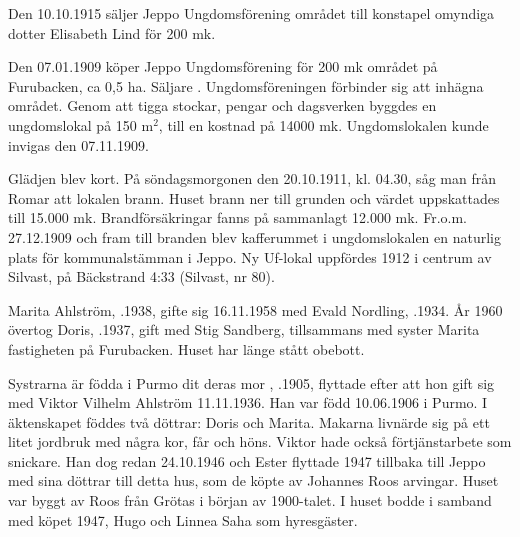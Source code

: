 %

Den 10.10.1915 säljer Jeppo Ungdomsförening området till konstapel  omyndiga dotter  Elisabeth Lind för 200 mk.


%
Den 07.01.1909 köper Jeppo Ungdomsförening för 200 mk området på Furubacken, ca 0,5 ha. Säljare . Ungdomsföreningen förbinder sig att inhägna området. Genom att tigga stockar, pengar och dagsverken byggdes en ungdomslokal på 150 m$^2$, till en kostnad på 14000 mk. Ungdomslokalen kunde invigas den 07.11.1909.

Glädjen blev kort. På söndagsmorgonen den 20.10.1911, kl. 04.30, såg man från Romar att lokalen brann. Huset brann ner till grunden och värdet uppskattades till 15.000 mk. Brandförsäkringar fanns på sammanlagt 12.000 mk. Fr.o.m. 27.12.1909 och fram till branden blev kafferummet i ungdomslokalen en naturlig plats för kommunalstämman i Jeppo. Ny Uf-lokal uppfördes 1912 i centrum av Silvast, på Bäckstrand 4:33 (Silvast, nr 80).


%



%
Marita Ahlström, .1938, gifte sig 16.11.1958 med Evald Nordling, .1934. År 1960 övertog Doris, .1937, gift med Stig Sandberg, tillsammans med syster Marita fastigheten på Furubacken. Huset har länge stått obebott.

Systrarna är födda i Purmo dit deras mor , .1905, flyttade efter att hon gift sig med Viktor Vilhelm Ahlström 11.11.1936. Han var född 10.06.1906 i Purmo. I äktenskapet föddes två  döttrar: Doris och Marita. Makarna livnärde sig på ett litet jordbruk med några kor, får och höns. Viktor hade också förtjänstarbete som snickare. Han dog redan 24.10.1946 och Ester flyttade 1947 tillbaka till Jeppo med sina döttrar till detta hus, som de köpte av Johannes Roos arvingar. Huset var byggt av Roos från Grötas i början av 1900-talet. I huset bodde i samband med köpet 1947, Hugo och Linnea Saha som hyresgäster.

